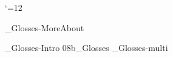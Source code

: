 



 \catcode`\@=12













_Glosses-MoreAbout
%
%
\bye



%
%
%


\bye
_Glosses-Intro
\get 08b_Glosses
_Glosses-multi

